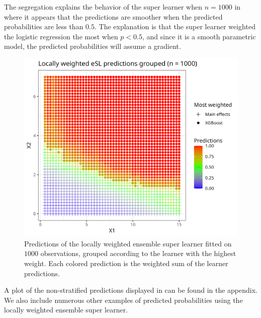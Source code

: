\documentclass[./main.tex]{subfiles}
\begin{document}
The segregation explains the behavior of the super learner when $ n = 1000 $ in  where it appears that the predictions are smoother when the predicted probabilities are less than $ 0.5 $. The explanation is that the super learner weighted the logistic regression the most when $ p < 0.5 $, and since it is a smooth parametric model, the predicted probabilities will assume a gradient. 
\begin{figure}[H]
    \centering
    \includegraphics[width=\textwidth]{figures/esl_preds_lw_stratified.png}
    \caption{Predictions of the locally weighted ensemble super learner fitted on $ 1000 $ observations, grouped according to the learner with the highest weight. Each colored prediction is the weighted sum of the learner predictions.}
    \label{fig:esl_preds_lw_stratified}
\end{figure}
A plot of the non-stratified predictions displayed in  can be found in the appendix. We also include numerous other examples of predicted probabilities using the locally weighted ensemble super learner.
\end{document}
